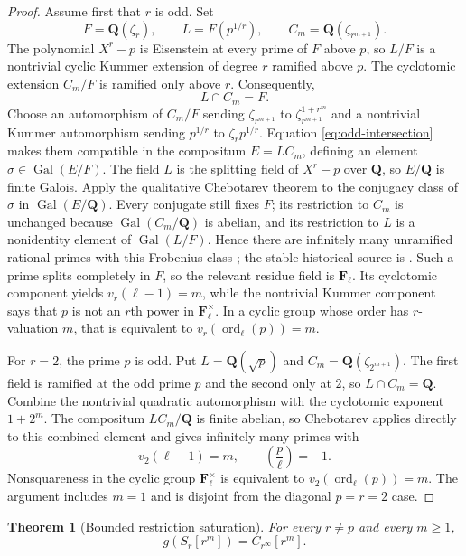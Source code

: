 \documentclass[11pt]{article}
\newtheorem{theorem}{Theorem}[section]
\theoremstyle{definition}
\DeclareMathOperator{\ord}{ord}
\DeclareMathOperator{\Gal}{Gal}
\begin{document}
\begin{proof}
Assume first that $r$ is odd.  Set
\[
F=\mathbf Q(\zeta_r),
\qquad L=F(p^{1/r}),
\qquad C_m=\mathbf Q(\zeta_{r^{m+1}}).
\]
The polynomial $X^r-p$ is Eisenstein at every prime of $F$ above $p$, so
$L/F$ is a nontrivial cyclic Kummer extension of degree $r$ ramified above
$p$.  The cyclotomic extension $C_m/F$ is ramified only above $r$.
Consequently,
\begin{equation}\label{eq:odd-intersection}
L\cap C_m=F.
\end{equation}
Choose an automorphism of $C_m/F$ sending
$\zeta_{r^{m+1}}$ to $\zeta_{r^{m+1}}^{1+r^m}$ and a nontrivial Kummer
automorphism sending $p^{1/r}$ to $\zeta_rp^{1/r}$.  Equation
\eqref{eq:odd-intersection} makes them compatible in the compositum
$E=LC_m$, defining an element $\sigma\in\Gal(E/F)$.  The field $L$ is the
splitting field of $X^r-p$ over $\mathbf Q$, so $E/\mathbf Q$ is finite
Galois.  Apply the qualitative Chebotarev theorem to the conjugacy class of
$\sigma$ in $\Gal(E/\mathbf Q)$.  Every conjugate still fixes $F$; its
restriction to $C_m$ is unchanged because $\Gal(C_m/\mathbf Q)$ is abelian,
and its restriction to $L$ is a nonidentity element of $\Gal(L/F)$.  Hence there are infinitely
many unramified rational primes with this Frobenius class
\citep[Theorem~28.9]{Sutherland2021Chebotarev}; the stable historical
source is \citet{LagariasOdlyzko1977}.  Such a prime splits completely in
$F$, so the relevant residue field is $\mathbf F_\ell$.  Its cyclotomic
component yields $v_r(\ell-1)=m$, while the nontrivial Kummer component says
that $p$ is not an $r$th power in $\mathbf F_\ell^\times$.  In a cyclic group
whose order has $r$-valuation $m$, that is equivalent to
$v_r(\ord_\ell(p))=m$.

For $r=2$, the prime $p$ is odd.  Put
$L=\mathbf Q(\sqrt p)$ and $C_m=\mathbf Q(\zeta_{2^{m+1}})$.  The first
field is ramified at the odd prime $p$ and the second only at $2$, so
$L\cap C_m=\mathbf Q$.  Combine the nontrivial quadratic automorphism with
the cyclotomic exponent $1+2^m$.  The compositum $LC_m/\mathbf Q$ is finite
abelian, so Chebotarev applies directly to this combined element and gives
infinitely many primes with
\[
v_2(\ell-1)=m,
\qquad
\left(\frac p\ell\right)=-1.
\]
Nonsquareness in the cyclic group $\mathbf F_\ell^\times$ is equivalent to
$v_2(\ord_\ell(p))=m$.  The argument includes $m=1$ and is disjoint from the
diagonal $p=r=2$ case.
\end{proof}

\begin{theorem}[Bounded restriction saturation]\label{thm:saturation}
For every $r\ne p$ and every $m\ge1$,
\begin{equation}\label{eq:saturation}
g(S_r[r^m])=C_{r^\infty}[r^m].
\end{equation}
\end{theorem}
\end{document}
